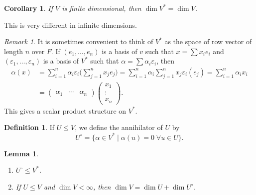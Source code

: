 \documentclass[12pt]{article}
\newtheorem{corollary}{Corollary}[section]
\newtheorem{lemma}{Lemma}[section]
\theoremstyle{definition}
\newtheorem{definition}{Definition}[section]
\theoremstyle{remark}
\newtheorem*{remark}{Remark}
\begin{document}
\begin{corollary}
	If $V$ is finite dimensional, then $\dim V^{\ast} = \dim V$.
\end{corollary}

This is very different in infinite dimensions.

\begin{remark}
	It is sometimes convenient to think of $V^{\ast}$ as the space of row vector of length $n$ over $F$. If $(e_1, \ldots, e_n)$ is a basis of $v$ such that $x = \sum x_i e_i$ and $(\varepsilon_1, \ldots, \varepsilon_n)$ is a basis of $V^{\ast}$ such that $\alpha = \sum \alpha_i \varepsilon_i$, then
	\begin{align*}
		\alpha(x) &= \sum_{i = 1}^{n} \alpha_i \varepsilon_i \Biggl( \sum_{j = 1}^{n} x_j e_j \Biggr) = \sum_{i = 1}^{n} \alpha_i \sum_{j = 1}^{n} x_j \varepsilon_i(e_j) = \sum_{i = 1}^{n} \alpha_i x_i \\
			  &= 
			  \begin{pmatrix}
				  \alpha_1 & \cdots & \alpha_n
			  \end{pmatrix}
			  \begin{pmatrix}
			  	x_1 \\
				\vdots \\
				x_n
			  \end{pmatrix}.
	\end{align*}
	This gives a scalar product structure on $V^{\ast}$.
\end{remark}

\begin{definition}
	If $U \leq V$, we define the annihilator of $U$ by
	\[
		U^{\circ} = \{\alpha \in V^{\ast} \mid \alpha(u) = 0 \; \forall u \in U\}
	.\]
\end{definition}
\newpage

\begin{lemma}
	\begin{enumerate}[\normalfont(i)]
		\item $U^{\circ} \le V^{\ast}$.
		\item If $U \leq V$ and $\dim V < \infty$, then $\dim V = \dim U + \dim U^{\circ}$.
	\end{enumerate}
\end{lemma}
\end{document}
